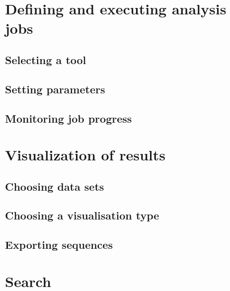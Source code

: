 \section{Defining and executing analysis jobs}
\subsection{Selecting a tool}
\subsection{Setting parameters}
\subsection{Monitoring job progress}
\section{Visualization of results}
\subsection{Choosing data sets}
\subsection{Choosing a visualisation type}
\subsection{Exporting sequences}
\section{Search}


